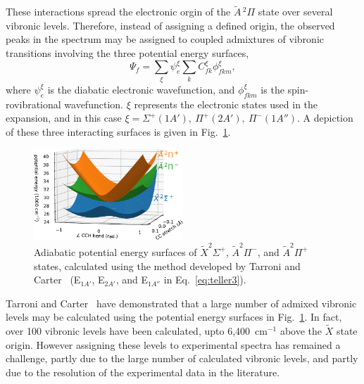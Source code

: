 \documentclass[journal=jpcafh,manuscript=article,layout=onecolumn, 12pt]{achemso}
\begin{document}
These interactions spread the electronic orgin of the $\tilde{A}\,^2\Pi$ state over several vibronic levels. Therefore, instead of assigning a defined origin, the observed peaks in the spectrum may be assigned to coupled admixtures of vibronic transitions involving the three potential energy surfaces,
\begin{equation}
\Psi_f = \sum_\xi \psi_e^\xi \sum_k C_{fk}^\xi\phi_{fkm}^\xi,
\label{eq:teller3} 
\end{equation}
where $\psi_e^\xi$ is the diabatic electronic wavefunction, and $\phi_{fkm}^\xi$ is the spin-rovibrational wavefunction. $\xi$ represents the electronic states used in the expansion, and in this case $\xi=\Sigma^+(1A'),~\Pi^+(2A'),~\Pi^-(1A'')$. A depiction of these three interacting surfaces is given in Fig.~\ref{fig:3}.

\begin{figure}
	\centering
	\includegraphics[width=0.5\textwidth]{figures/Fig3}
	\caption{Adiabatic potential energy surfaces of $\tilde{X}^2\Sigma^+$, $\tilde{A}^2\Pi^-$, and $\tilde{A}^2\Pi^+$ states, calculated using the method developed by Tarroni and Carter~\cite{tar03} (E$_{1A'}$, E$_{2A'}$, and E$_{1A''}$ in Eq.~\ref{eq:teller3}).}
	\label{fig:3}
\end{figure}

Tarroni and Carter~\cite{tar03} have demonstrated that a large number of admixed vibronic levels may be calculated using the potential energy surfaces in Fig.~\ref{fig:3}. In fact, over 100 vibronic levels have been calculated, upto 6,400~cm$^{-1}$ above the $\tilde{X}$ state origin. However assigning these levels to experimental spectra has remained a challenge, partly due to the large number of calculated vibronic levels, and partly due to the resolution of the experimental data in the literature. 

\end{document}
